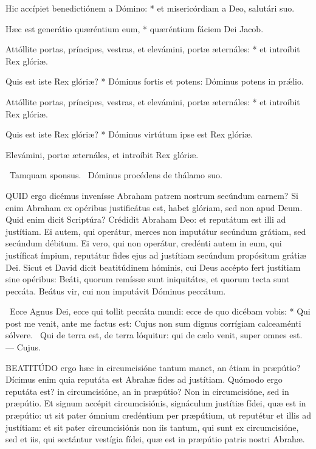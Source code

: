 Hic accípiet benedictiónem a Dómino: * et misericórdiam a Deo, salutári suo.

Hæc est generátio quæréntium eum, * quæréntium fáciem Dei Jacob.

Attóllite portas, príncipes, vestras, et elevámini, portæ æternáles: * et introíbit Rex glóriæ.

Quis est iste Rex glóriæ? * Dóminus fortis et potens: Dóminus potens in prǽlio.

Attóllite portas, príncipes, vestras, et elevámini, portæ æternáles: * et introíbit Rex glóriæ.

Quis est iste Rex glóriæ? * Dóminus virtútum ipse est Rex glóriæ.

 Elevámini, portæ æternáles, et introíbit Rex glóriæ.

\V\ Tamquam sponsus. \R\ Dóminus procédens de thálamo suo.



\lettrine[lines=2]{Q}{UID} ergo dicémus invenísse Abraham patrem nostrum secúndum carnem? Si enim Abraham ex opéribus justificátus est, habet glóriam, sed non apud Deum. Quid enim dicit Scriptúra? Crédidit Abraham Deo: et reputátum est illi ad justítiam. Ei autem, qui operátur, merces non imputátur secúndum grátiam, sed secúndum débitum. Ei vero, qui non operátur, credénti autem in eum, qui justíficat ímpium, reputátur fides ejus ad justítiam secúndum propósitum grátiæ Dei. Sicut et David dicit beatitúdinem hóminis, cui Deus accépto fert justítiam sine opéribus: Beáti, quorum remíssæ sunt iniquitátes, et quorum tecta sunt peccáta. Beátus vir, cui non imputávit Dóminus peccátum.

\R\ Ecce Agnus Dei, ecce qui tollit peccáta mundi: ecce de quo dicébam vobis: * Qui post me venit, ante me factus est: Cujus non sum dignus corrígiam calceaménti sólvere. \V\ Qui de terra est, de terra lóquitur: qui de cælo venit, super omnes est. --- Cujus.


\lettrine[lines=2]{B}{EATITÚDO} ergo hæc in circumcisióne tantum manet, an étiam in præpútio? Dícimus enim quia reputáta est Abrahæ fides ad justítiam. Quómodo ergo reputáta est? in circumcisióne, an in præpútio? Non in circumcisióne, sed in præpútio. Et signum accépit circumcisiónis, signáculum justítiæ fídei, quæ est in præpútio: ut sit pater ómnium credéntium per præpútium, ut reputétur et illis ad justítiam: et sit pater circumcisiónis non iis tantum, qui sunt ex circumcisióne, sed et iis, qui sectántur vestígia fídei, quæ est in præpútio patris nostri Abrahæ.


